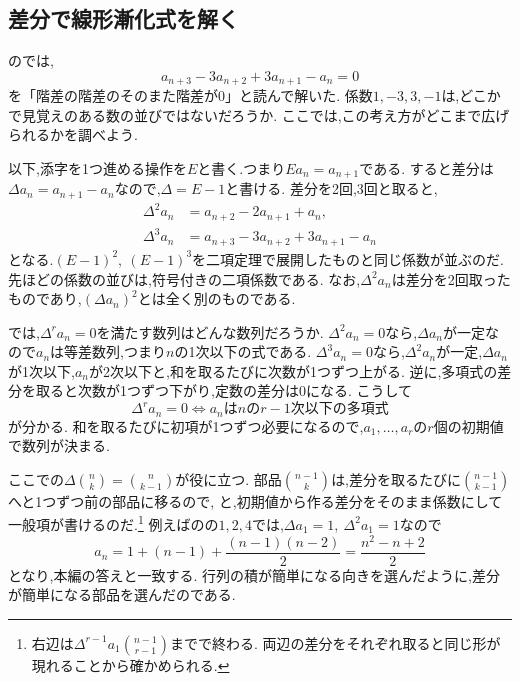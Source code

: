 \subsection{差分で線形漸化式を解く}\label{節：差分で線形漸化式を解く}
のでは,
\[
  a_{n+3}-3a_{n+2}+3a_{n+1}-a_n=0
\]
を「階差の階差のそのまた階差が0」と読んで解いた.
係数$1,-3,3,-1$は,どこかで見覚えのある数の並びではないだろうか.
ここでは,この考え方がどこまで広げられるかを調べよう.

以下,添字を1つ進める操作を$E$と書く.つまり$Ea_n=a_{n+1}$である.
すると差分は$\Delta a_n=a_{n+1}-a_n$なので,$\Delta=E-1$と書ける.
差分を2回,3回と取ると,
\[
  \begin{aligned}
    \Delta^2a_n&=a_{n+2}-2a_{n+1}+a_n,\\
    \Delta^3a_n&=a_{n+3}-3a_{n+2}+3a_{n+1}-a_n
  \end{aligned}
\]
となる.$(E-1)^2,\ (E-1)^3$を二項定理で展開したものと同じ係数が並ぶのだ.
先ほどの係数の並びは,符号付きの二項係数である.
なお,$\Delta^2a_n$は差分を2回取ったものであり,$(\Delta a_n)^2$とは全く別のものである.

では,$\Delta^ra_n=0$を満たす数列はどんな数列だろうか.
$\Delta^2a_n=0$なら,$\Delta a_n$が一定なので$a_n$は等差数列,つまり$n$の1次以下の式である.
$\Delta^3a_n=0$なら,$\Delta^2a_n$が一定,$\Delta a_n$が1次以下,$a_n$が2次以下と,和を取るたびに次数が1つずつ上がる.
逆に,多項式の差分を取ると次数が1つずつ下がり,定数の差分は0になる.
こうして
\[
  \Delta^ra_n=0
  \iff
  a_n\text{は}n\text{の}r-1\text{次以下の多項式}
\]
が分かる.
和を取るたびに初項が1つずつ必要になるので,$a_1,\ldots,a_r$の$r$個の初期値で数列が決まる.

ここでの$\Delta\binom nk=\binom n{k-1}$が役に立つ.
部品$\binom{n-1}{k}$は,差分を取るたびに$\binom{n-1}{k-1}$へと1つずつ前の部品に移るので,
\BookMathLayout{\[
  a_n=a_1+\Delta a_1\binom{n-1}1+\Delta^2a_1\binom{n-1}2+\cdots
\]}{\[
  \begin{aligned}
    a_n&=a_1+\Delta a_1\binom{n-1}1\\
    &\quad+\Delta^2a_1\binom{n-1}2+\cdots
  \end{aligned}
\]}
と,初期値から作る差分をそのまま係数にして一般項が書けるのだ.\footnote{右辺は$\Delta^{r-1}a_1\binom{n-1}{r-1}$までで終わる.
  両辺の差分をそれぞれ取ると同じ形が現れることから確かめられる.}
例えばのの$1,2,4$では,$\Delta a_1=1,\ \Delta^2a_1=1$なので
\[
  a_n=1+(n-1)+\frac{(n-1)(n-2)}2=\frac{n^2-n+2}2
\]
となり,本編の答えと一致する.
行列の積が簡単になる向きを選んだように,差分が簡単になる部品を選んだのである.

